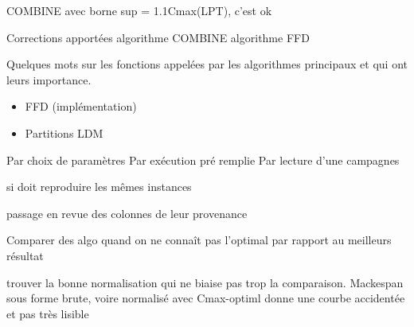 \documentclass[a4paper,12pt]{report}
\theoremstyle{plain}				%
\theoremstyle{definition}				%
\begin{document}
\begin{appendices}
COMBINE avec borne sup = 1.1Cmax(LPT), c'est ok

Corrections apportées
algorithme COMBINE
algorithme FFD


Quelques mots sur les fonctions appelées par les algorithmes principaux et qui ont leurs importance.

\begin{itemize}
\item FFD \cite{rieck2010basic} (implémentation)
\item Partitions LDM
\end{itemize}


Par choix de paramètres
Par exécution pré remplie
Par lecture d'une campagnes

si doit reproduire les mêmes instances



passage en revue des colonnes de leur provenance



Comparer des algo quand on ne connaît pas l'optimal
par rapport au meilleurs résultat


trouver la bonne normalisation qui ne biaise pas trop la comparaison.
Mackespan sous forme brute, voire normalisé avec Cmax-optiml donne une courbe  accidentée et pas très lisible


\end{appendices}
\end{document}
